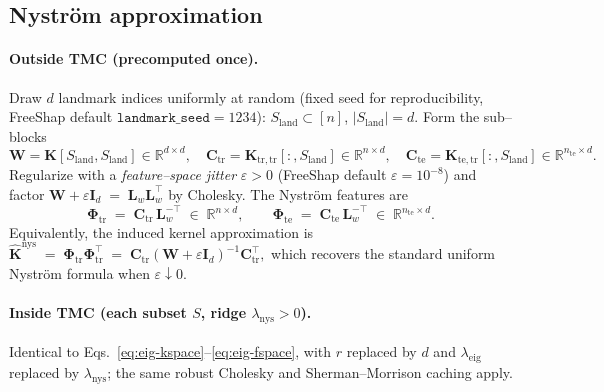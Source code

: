\subsection{Nystr\"om approximation}

\paragraph{Outside TMC (precomputed once).}
Draw $d$ landmark indices uniformly at random (fixed seed for reproducibility, FreeShap default $\texttt{landmark\_seed}=1234$): $S_{\mathrm{land}}\subset[n]$, $|S_{\mathrm{land}}|=d$. Form the sub--blocks
\begin{equation*}
\mathbf{W}=\mathbf{K}[S_{\mathrm{land}},S_{\mathrm{land}}]\in\mathbb{R}^{d\times d},\quad
\mathbf{C}_{\mathrm{tr}}=\mathbf{K}_{\mathrm{tr,tr}}[:,S_{\mathrm{land}}]\in\mathbb{R}^{n\times d},\quad
\mathbf{C}_{\mathrm{te}}=\mathbf{K}_{\mathrm{te,tr}}[:,S_{\mathrm{land}}]\in\mathbb{R}^{n_{\mathrm{te}}\times d}.
\end{equation*}
Regularize with a \emph{feature--space jitter} $\varepsilon>0$ (FreeShap default $\varepsilon=10^{-8}$) and factor
$
\mathbf{W}+\varepsilon\mathbf{I}_d \;=\; \mathbf{L}_w\mathbf{L}_w^{\!\top}
$
by Cholesky. The Nystr\"om features are
\begin{equation}
\boxed{\;
\boldsymbol{\Phi}_{\mathrm{tr}} \;=\; \mathbf{C}_{\mathrm{tr}}\,\mathbf{L}_w^{-\top}\;\in\;\mathbb{R}^{n\times d},
\qquad
\boldsymbol{\Phi}_{\mathrm{te}} \;=\; \mathbf{C}_{\mathrm{te}}\,\mathbf{L}_w^{-\top}\;\in\;\mathbb{R}^{n_{\mathrm{te}}\times d}.\;}
\label{eq:phi-nys}
\end{equation}
Equivalently, the induced kernel approximation is
$
\widehat{\mathbf{K}}^{\mathrm{nys}}
\;=\;\boldsymbol{\Phi}_{\mathrm{tr}}\boldsymbol{\Phi}_{\mathrm{tr}}^{\!\top}
\;=\;\mathbf{C}_{\mathrm{tr}}(\mathbf{W}+\varepsilon\mathbf{I}_d)^{-1}\mathbf{C}_{\mathrm{tr}}^{\!\top},
$
which recovers the standard uniform Nystr\"om formula when $\varepsilon\!\downarrow\!0$.

\paragraph{Inside TMC (each subset $S$, ridge $\lambda_{\mathrm{nys}}\!>\!0$).}
Identical to Eqs.~\eqref{eq:eig-kspace}--\eqref{eq:eig-fspace}, with $r$ replaced by $d$ and $\lambda_{\mathrm{eig}}$ replaced by $\lambda_{\mathrm{nys}}$; the same robust Cholesky and Sherman--Morrison caching apply.

